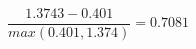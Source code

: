 \documentclass[xcolor={table}]{beamer}
\begin{document}
%
%
%
%
%
%



 \begin{frame} 
\begin{equation*}
\frac{1.3743 - 0.401}{max(0.401, 1.374)} = 0.7081
\end{equation*}
\end{frame} 
\end{document}
